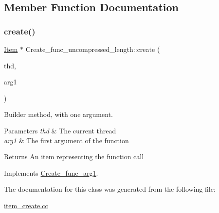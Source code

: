 \subsection{Member Function Documentation}
\mbox{\label{classCreate__func__uncompressed__length_a600d8a722729d4d8859207c831eba61b}} 
\subsubsection{\texorpdfstring{create()}{create()}}
{\footnotesize\ttfamily \mbox{\hyperlink{classItem}{Item}} $\ast$ Create\+\_\+func\+\_\+uncompressed\+\_\+length\+::create (\begin{DoxyParamCaption}\item[{T\+HD $\ast$}]{thd,  }\item[{\mbox{\hyperlink{classItem}{Item}} $\ast$}]{arg1 }\end{DoxyParamCaption})\hspace{0.3cm}{\ttfamily [virtual]}}

Builder method, with one argument. 
\begin{DoxyParams}{Parameters}
{\em thd} & The current thread \\
\hline
{\em arg1} & The first argument of the function \\
\hline
\end{DoxyParams}
\begin{DoxyReturn}{Returns}
An item representing the function call 
\end{DoxyReturn}


Implements \mbox{\hyperlink{classCreate__func__arg1_a3e9a98f755cd82c3e762e334c955a8c9}{Create\+\_\+func\+\_\+arg1}}.



The documentation for this class was generated from the following file\+:\begin{DoxyCompactItemize}
\item 
\mbox{\hyperlink{item__create_8cc}{item\+\_\+create.\+cc}}\end{DoxyCompactItemize}
